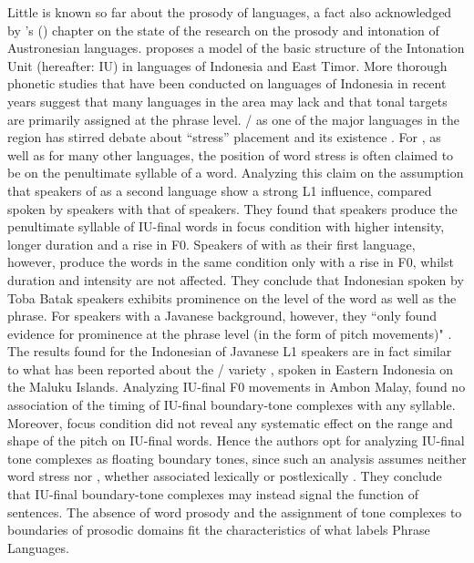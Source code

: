 Little is known so far about the prosody  of  languages, a fact also acknowledged by \citeauthor{Himmelmann_Kaufmann_Prosody}'s (\citeyear{Himmelmann_Kaufmann_Prosody}) chapter on the state of the research on the prosody and intonation of Austronesian languages. \citet[348]{Himmelmann_Preliminary_2018}  proposes a model of the basic structure of the Intonation Unit (hereafter: IU) in  languages of Indonesia and East Timor.
More thorough phonetic studies that have been conducted on  languages of Indonesia in recent years suggest that many languages in the area may lack  and that tonal targets are primarily assigned at the phrase level.  /  as one of the major languages in the region has stirred debate about “stress” placement  and its existence \citep[for a summary see][28--9]{goedemans2007stress}. For , as well as for many other  languages, the position of word stress is often claimed to be on the penultimate syllable of a word. Analyzing this claim on the assumption that speakers of  as a second language show a strong L1 influence, \citet[42]{goedemans2007stress} compared  spoken by  speakers with that of  speakers. They found that  speakers produce the penultimate syllable of IU-final words in focus condition  with higher intensity, longer duration and a rise in F0. Speakers of  with  as their first language, however, produce the words in the same condition only with a rise in F0, whilst duration and intensity are not affected. They conclude that Indonesian spoken by Toba Batak speakers exhibits prominence on the level of the word as well as the phrase. For speakers with a Javanese background, however, they ``only found evidence for prominence at the phrase level (in the form of pitch movements)" \citep[45]{goedemans2007stress}. 
The results found for the Indonesian of Javanese L1 speakers are in fact similar to what has been reported about the / variety , spoken in Eastern Indonesia on the Maluku Islands. Analyzing IU-final F0 movements in Ambon Malay, \citet[382]{Maskikit_Essed_2016}  found no association of the timing of IU-final boundary-tone complexes with any syllable. Moreover, focus condition did not reveal any systematic effect on the range and shape of the pitch on IU-final words. Hence the authors opt for analyzing IU-final tone complexes as floating boundary tones, since such an analysis assumes neither word stress nor , whether associated lexically  or postlexically  \citep[356]{Maskikit_Essed_2016}. They conclude that IU-final boundary-tone complexes may instead signal the function of sentences.
The absence of word prosody and the assignment of tone complexes to boundaries of prosodic domains fit the characteristics of what \citet{Fery_2016}  labels Phrase Languages.



